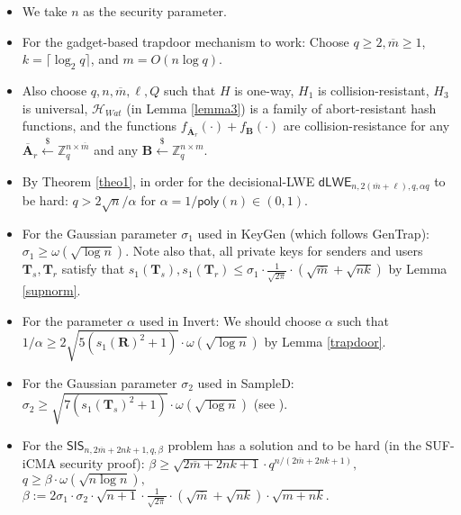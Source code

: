 \documentclass[a4paper,11pt,onecolumn]{elsarticle}
\begin{document}
	\begin{itemize}
		\item We take $n$ as the security parameter.
		\item For the gadget-based trapdoor mechanism to work: Choose $ q\ge 2, \overline{m} \ge 1 $, $ k = \lceil \log_2  q \rceil $, and $m = O(n\log q)$.
		
		\item Also choose $q, n, \overline{m} ,\ell, Q$ such  that  $H$ is one-way, $H_1$ is collision-resistant,    $H_3$ is  universal, $\mathcal{H}_{Wat}$ (in Lemma \ref{lemma3}) is a family of  abort-resistant hash functions, and  the functions $ f_{\overline{\textbf{A}}_{r}}(\cdot)+f_{\textbf{B}}(\cdot)$ are collision-resistance   for any $\overline{\mathbf{A}}_r \xleftarrow{\$} \mathbb{Z}_q^{n \times\overline{ m}}$ and any $\mathbf{B} \xleftarrow{\$} \mathbb{Z}_q^{n \times m}$.
		\item By Theorem  \ref{theo1}, in order for  the decisional-LWE $\mathsf{dLWE}_{n,2(\overline{m}+\ell), q,\alpha q}$ to be hard: $ q>2\sqrt{n}/\alpha $ for $\alpha=1/\textsf{poly}(n) \in (0,1)$. 

	
		\item For the Gaussian parameter $\sigma_1$ used in \textsf{KeyGen} (which follows \textsf{GenTrap}):   $\sigma_1 \geq \omega(\sqrt{\log n})$. Note also that, all private keys for senders and users $\mathbf{T}_s, \mathbf{T}_r$ satisfy that $ s_1(\mathbf{T}_s), s_1(\mathbf{T}_r) \leq \sigma_1 \cdot \frac{1}{\sqrt{2\pi}}\cdot (\sqrt{\overline{m}}+\sqrt{nk})$ by Lemma \ref{supnorm}.
		
		\item For  the parameter $\alpha$ used in \textsf{Invert}:  We should choose $\alpha$ such that  $1/\alpha \geq 2 \sqrt{5 (s_1(\mathbf{R})^2+1)}\cdot \omega(\sqrt{\log n})$ by Lemma \ref{trapdoor}.
		\item For the Gaussian parameter $\sigma_2$ used in \textsf{SampleD}:  $ \sigma_2 \geq \sqrt{7( s_1(\mathbf{T}_s)^2+1)}\cdot \omega(\sqrt{\log n})$ (see \cite[Section 5.4]{MP12}).
		
	
		\item For the 
		$\mathsf{SIS}_{n, 2\overline{m}+2nk+1, q, \beta}$ problem has a solution and to be hard  (in the SUF-iCMA security proof):
		$\beta \geq \sqrt{2\overline{m}+2nk+1}\cdot q^{n/(2\overline{m}+2nk+1)}, $ $ q \geq \beta\cdot \omega(\sqrt{n\log n}),$ $ \beta:=  2\sigma_1\cdot \sigma_2\cdot \sqrt{n+1} \cdot \frac{1}{\sqrt{2\pi}}\cdot (\sqrt{\overline{m}}+\sqrt{nk}) \cdot\sqrt{m+nk} .$
	\end{itemize}
	
\end{document}
